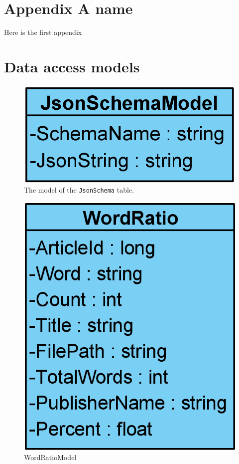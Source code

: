 \chapter{Appendix A name}\label{ch:appAlabel}
Here is the first appendix

\chapter{Data access models}\label{AppDataAccess}
\begin{figure}[H]
    \centering
    \includegraphics[scale=0.25]{Images/JsonSchemaModel.png}
    \caption{The model of the \texttt{JsonSchema} table.}
    \label{JsonSchemaModel}
\end{figure}
\begin{figure}[H]
    \centering
    \includegraphics[scale=0.25]{Images/WordRatioModel.png}
    \caption{WordRatioModel}
    \label{WordRatioModel}
\end{figure}